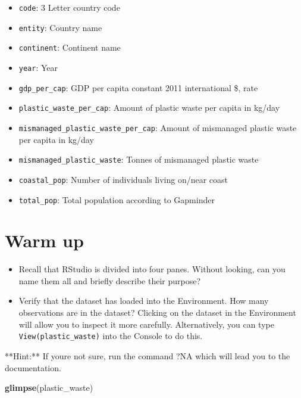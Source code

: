 \documentclass[
]{article}
\newenvironment{Shaded}{\begin{snugshade}}{\end{snugshade}}
\newcommand{\FunctionTok}[1]{\textcolor[rgb]{0.13,0.29,0.53}{\textbf{#1}}}
\newcommand{\NormalTok}[1]{#1}
\providecommand{\tightlist}{%
  \setlength{\itemsep}{0pt}\setlength{\parskip}{0pt}}
\begin{document}
\begin{itemize}
\tightlist
\item
  \texttt{code}: 3 Letter country code
\item
  \texttt{entity}: Country name
\item
  \texttt{continent}: Continent name
\item
  \texttt{year}: Year
\item
  \texttt{gdp\_per\_cap}: GDP per capita constant 2011 international \$,
  rate
\item
  \texttt{plastic\_waste\_per\_cap}: Amount of plastic waste per capita
  in kg/day
\item
  \texttt{mismanaged\_plastic\_waste\_per\_cap}: Amount of mismanaged
  plastic waste per capita in kg/day
\item
  \texttt{mismanaged\_plastic\_waste}: Tonnes of mismanaged plastic
  waste
\item
  \texttt{coastal\_pop}: Number of individuals living on/near coast
\item
  \texttt{total\_pop}: Total population according to Gapminder
\end{itemize}

\section{Warm up}\label{warm-up}

\begin{itemize}
\tightlist
\item
  Recall that RStudio is divided into four panes. Without looking, can
  you name them all and briefly describe their purpose?
\item
  Verify that the dataset has loaded into the Environment. How many
  observations are in the dataset? Clicking on the dataset in the
  Environment will allow you to inspect it more carefully.
  Alternatively, you can type \texttt{View(plastic\_waste)} into the
  Console to do this.
\end{itemize}

\begin{Shaded}
\begin{Highlighting}[]
\NormalTok{**Hint:** If you\textquotesingle{}re not sure, run the command \textasciigrave{}?NA\textasciigrave{} which will lead you to the documentation.}
\end{Highlighting}
\end{Shaded}

\begin{Shaded}
\begin{Highlighting}[]
\FunctionTok{glimpse}\NormalTok{(plastic\_waste)}
\end{Highlighting}
\end{Shaded}
\end{document}
